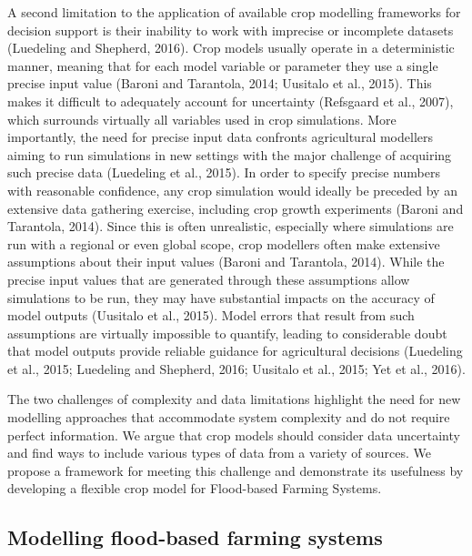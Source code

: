 \documentclass[]{elsarticle} %
\begin{document}
A second limitation to the application of available crop modelling frameworks for decision support is their inability to work with imprecise or incomplete datasets (Luedeling and Shepherd, 2016). Crop models usually operate in a deterministic manner, meaning that for each model variable or parameter they use a single precise input value (Baroni and Tarantola, 2014; Uusitalo et al., 2015). This makes it difficult to adequately account for uncertainty (Refsgaard et al., 2007), which surrounds virtually all variables used in crop simulations. More importantly, the need for precise input data confronts agricultural modellers aiming to run simulations in new settings with the major challenge of acquiring such precise data (Luedeling et al., 2015). In order to specify precise numbers with reasonable confidence, any crop simulation would ideally be preceded by an extensive data gathering exercise, including crop growth experiments (Baroni and Tarantola, 2014). Since this is often unrealistic, especially where simulations are run with a regional or even global scope, crop modellers often make extensive assumptions about their input values (Baroni and Tarantola, 2014). While the precise input values that are generated through these assumptions allow simulations to be run, they may have substantial impacts on the accuracy of model outputs (Uusitalo et al., 2015). Model errors that result from such assumptions are virtually impossible to quantify, leading to considerable doubt that model outputs provide reliable guidance for agricultural decisions (Luedeling et al., 2015; Luedeling and Shepherd, 2016; Uusitalo et al., 2015; Yet et al., 2016).

The two challenges of complexity and data limitations highlight the need for new modelling approaches that accommodate system complexity and do not require perfect information. We argue that crop models should consider data uncertainty and find ways to include various types of data from a variety of sources. We propose a framework for meeting this challenge and demonstrate its usefulness by developing a flexible crop model for Flood-based Farming Systems.

\hypertarget{ref11}{%
\subsection{Modelling flood-based farming systems}\label{ref11}}
\end{document}
